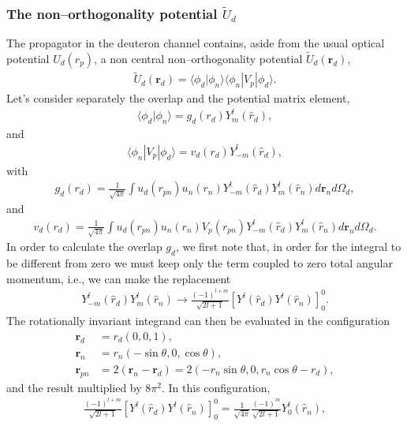 \documentclass[a4paper,11pt]{article}
\newcommand{\braket}[1]{\langle {#1} \rangle }
\newcommand{\ket}[1]{|{#1} \rangle }
\newcommand{\bra}[1]{\langle {#1}|}
\begin{document}
\subsubsection{The non--orthogonality potential $\widetilde{U}_d$}
The propagator in the deuteron channel contains, aside from the usual optical potential $U_d(r_p)$, a non central non--orthogonality potential $\widetilde{U}_d(\mathbf r_d)$,
  \begin{align}\label{eq86}
  \widetilde U_d(\mathbf r_d)=\braket{\phi_d|\phi_n}\bra{\phi_n}V_p\ket{\phi_d}.
  \end{align}
Let's consider separately the overlap and the potential matrix element,
  \begin{align}\label{eq87}
  \braket{\phi_d|\phi_n}=g_d(r_d)Y^l_m(\hat r_d),
  \end{align}
  and
    \begin{align}\label{eq88}
\bra{\phi_n}V_p\ket{\phi_d}=v_d(r_d)Y^l_{-m}(\hat r_d),
    \end{align}
    with
  \begin{align}\label{eq89}
g_d(r_d)=\frac{1}{\sqrt{4\pi}}\int u_d(r_{pn})u_n(r_n)Y^l_{-m}(\hat r_d)Y^l_{m}(\hat r_n)d\mathbf r_nd\Omega_d,
  \end{align}
and
  \begin{align}\label{eq90}
  v_d(r_d)=\frac{1}{\sqrt{4\pi}}\int u_d(r_{pn})u_n(r_n)V_p(r_{pn})Y^l_{-m}(\hat r_d)Y^l_{m}(\hat r_n)d\mathbf r_nd\Omega_d.
  \end{align}
In order to calculate the overlap $g_d$, we first note that, in order for the integral to be different from zero we must keep only the term coupled to zero total angular momentum, i.e., we can make the replacement
  \begin{align}\label{eq91}
Y^l_{-m}(\hat r_d)Y^l_{m}(\hat r_n)\rightarrow \frac{(-1)^{l+m}}{\sqrt{2l+1}}\left[Y^l(\hat r_d)Y^l(\hat r_n)\right]^0_0.
  \end{align}
The rotationally invariant integrand can then be evaluated in the configuration
\begin{align}\label{eq95}
\nonumber\mathbf r_d&=r_d\left(0,0,1\right),\\
\nonumber\mathbf r_{n}&=r_{n}\left(-\sin\theta,0,\cos\theta\right),\\
 \mathbf r_{pn}&=2(\mathbf r_n-\mathbf r_d)=2\left(-r_{n}\sin\theta,0,r_n\cos\theta-r_{d}\right),
\end{align}
 and the result multiplied by $8\pi^2$. In this configuration,
  \begin{align}\label{eq92}
\frac{(-1)^{l+m}}{\sqrt{2l+1}}\left[Y^l(\hat r_d)Y^l(\hat r_n)\right]^0_0=\frac{1}{\sqrt{4\pi}}\frac{(-1)^m}{\sqrt{2l+1}}Y^l_0(\hat r_n),
  \end{align}
\end{document}
